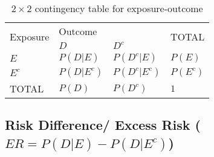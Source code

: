 \begin{customArrayStretch}{1.2}
\begin{table}[H]
    \centering
    \begin{tabular}{|l|l|l|l|}
        \hline

        \multirow{2}{*}{Exposure} &  \multicolumn{2}{|l|}{Outcome} & \multirow{2}{*}{TOTAL} \\
        \cline{2-3}
        & $D$ & $D^c$ & \\
        \hline

        $E$ & $P(D|E)$ & $P(D^c|E)$ & $P(E)$ \\ \hline

        $E^c$ & $P(D|E^c)$ & $P(D^c|E^c)$ & $P(E^c)$ \\ \hline

        TOTAL & $P(D)$ & $P(D^c)$ & $1$ \\ \hline

    \end{tabular}
    \caption{$2 \times 2$ contingency table for exposure-outcome}
    \label{statistics/probability-theory/Conditional Probability/contingency-table-exposure-outcome}
\end{table}
\end{customArrayStretch}

\subsection{Risk Difference/ Excess Risk ($ER = P(D|E) - P(D|E^c)$)}


